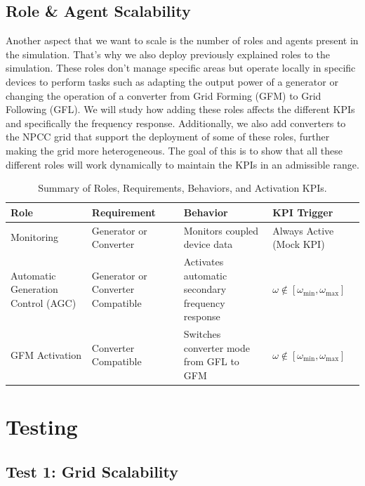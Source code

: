 \documentclass{article}
\begin{document}
\subsection*{Role \& Agent Scalability}

Another aspect that we want to scale is the number of roles and agents present in the simulation. That's why we also deploy previously explained roles to the simulation. These roles don't manage specific areas but operate locally in specific devices to perform tasks such as adapting the output power of a generator or changing the operation of a converter from Grid Forming (GFM) to Grid Following (GFL). We will study how adding these roles affects the different KPIs and specifically the frequency response. Additionally, we also add converters to the NPCC grid that support the deployment of some of these roles, further making the grid more heterogeneous. The goal of this is to show that all these different roles will work dynamically to maintain the KPIs in an admissible range.

\begin{table}[h]
    \centering
    \small %
    \renewcommand{\arraystretch}{1.2} %
    \begin{tabular}{|p{2cm}|p{3cm}|p{3cm}|p{2cm}|} %
    \hline
    \textbf{Role} & \textbf{Requirement} & \textbf{Behavior} & \textbf{KPI Trigger} \\
    \hline
    Monitoring & Generator or Converter & Monitors coupled device data & Always Active (Mock KPI) \\
    Automatic Generation Control (AGC) & Generator or Converter Compatible & Activates automatic secondary frequency response & $\omega \notin [\omega_{\min},  \omega_{\max}]$\\
    GFM Activation & Converter Compatible & Switches converter mode from GFL to GFM & $\omega \notin [\omega_{\min},  \omega_{\max}]$\\
    \hline
    \end{tabular}
    \caption{Summary of Roles, Requirements, Behaviors, and Activation KPIs.}
    \label{tab:roles}
\end{table}

\section{Testing}

\subsection*{Test 1: Grid Scalability}
\end{document}

